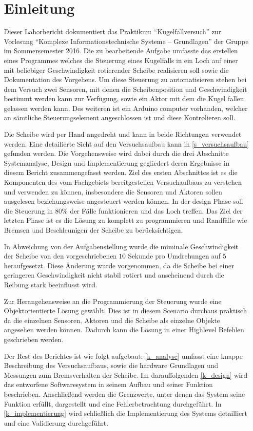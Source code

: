 \chapter{Einleitung}
Dieser Laborbericht dokumentiert das Praktikum \enquote{Kugelfallversuch} zur Vorlesung \enquote{Komplexe Informationstechnische Systeme -- Grundlagen} der Gruppe im Sommersemester 2016.
Die zu bearbeitende Aufgabe umfasste das erstellen eines Programmes welches die Steuerung eines Kugelfalls in ein Loch auf einer mit beliebiger Geschwindigkeit rotierender Scheibe realisieren soll sowie die Dokumentation des Vorgehens.
Um diese Steuerung zu automatisieren stehen bei dem Versuch zwei Sensoren, mit denen die Scheibenposition und Geschwindigkeit bestimmt werden kann zur Verfügung, sowie ein Aktor mit dem die Kugel fallen gelassen werden kann.
Des weiteren ist ein Arduino computer vorhanden, welcher an sämtliche Steuerungselement angeschlossen ist und diese Kontrolieren soll.

Die Scheibe wird per Hand angedreht und kann in beide Richtungen verwendet werden.
Eine detailierte Sicht auf den Versuchsaufbau kann in \cref{s_versuchsaufbau} gefunden werden.
Die Vorgehensweise wird dabei durch die drei Abschnitte Systemanalyse, Design und Implementierung gegliedert deren Ergebnisse in diesem Bericht zusammengefasst werden.
Ziel des ersten Abschnittes ist es die Komponenten des vom Fachgebiets bereitgestellen Versuchaufbaus zu verstehen und verwenden zu können, insbesondere die Sensoren und Aktoren sollen ausgelesen beziehungsweise angesteuert werden können.
In der design Phase soll die Steuerung in $80$\% der Fälle funktionieren und das Loch treffen.
Das Ziel der letzten Phase ist es die Lösung zu komplett zu programmieren und Randfälle wie Bremsen und Beschleunigen der Scheibe zu berücksichtigen.

In Abweichung von der Aufgabenstellung wurde die miminale Geschwindigkeit der Scheibe von den vorgeschriebenen $10$ Sekunde pro Umdrehungen auf $5$ heraufgesetzt.
Diese Änderung wurde vorgenommen, da die Scheibe bei einer geringeren Geschwindigkeit nicht stabil rotiert und anscheinend durch die Reibung stark beeinflusst wird. 

Zur Herangehensweise an die Programmierung der Steuerung wurde eine Objektorientierte Lösung gewählt.
Dies ist in diesem Scenario durchaus praktisch da die einzelnen Sensoren, Aktoren und die Scheibe als einzelne Objekte angesehen werden können.
Dadurch kann die Lösung in einer Highlevel Befehlen geschrieben werden.


Der Rest des Berichtes ist wie folgt aufgebaut:
\cref{k_analyse} umfasst eine knappe Beschreibung des Versuchsaufbaus, sowie die hardware Grundlagen und Messungen zum Bremsverhalten der Scheibe. 
Im darauffolgenden \cref{k_design} wird das entworfene Softwaresystem in seinem Aufbau und seiner Funktion beschrieben.
Anschließend werden die Grenzwerte, unter denen das System seine Funktion erfüllt, dargestellt und eine Fehlerbetrachtung durchgeführt.
In \cref{k_implementierung} wird schließlich die Implementierung des Systems detailliert und eine Validierung durchgeführt.
